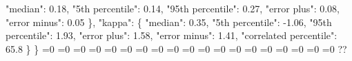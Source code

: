 {{        "median": 0.18, %
        "5th percentile": 0.14, %
        "95th percentile": 0.27, %
        "error plus": 0.08, %
        "error minus": 0.05%
      \}, %
      "kappa": \{%
        "median": 0.35, %
        "5th percentile": {-}1.06, %
        "95th percentile": 1.93, %
        "error plus": 1.58, %
        "error minus": 1.41, %
        "correlated percentile": 65.8%
      \}%
    \}}%
  \else%
    \ifnum{}=0%
      \let\mchieffCopulaCorrelationModel@I@out\mchieffCopulaCorrelationModel@III%
    \else%
      \ifnum{}=0%
      \let\mchieffCopulaCorrelationModel@I@out\mchieffCopulaCorrelationModel@IV%
    \else%
      \ifnum{}=0%
      \let\mchieffCopulaCorrelationModel@I@out\mchieffCopulaCorrelationModel@V%
    \else%
      \ifnum{}=0%
      \let\mchieffCopulaCorrelationModel@I@out\mchieffCopulaCorrelationModel@VI%
    \else%
      \ifnum{}=0%
      \let\mchieffCopulaCorrelationModel@I@out\mchieffCopulaCorrelationModel@VII%
    \else%
      \ifnum{}=0%
      \let\mchieffCopulaCorrelationModel@I@out\mchieffCopulaCorrelationModel@VIII%
    \else%
      \ifnum{}=0%
      \let\mchieffCopulaCorrelationModel@I@out\mchieffCopulaCorrelationModel@IX%
    \else%
      \ifnum{}=0%
      \let\mchieffCopulaCorrelationModel@I@out\mchieffCopulaCorrelationModel@X%
    \else%
      \ifnum{}=0%
      \let\mchieffCopulaCorrelationModel@I@out\mchieffCopulaCorrelationModel@XI%
    \else%
      \ifnum{}=0%
      \let\mchieffCopulaCorrelationModel@I@out\mchieffCopulaCorrelationModel@XII%
    \else%
      \ifnum{}=0%
      \let\mchieffCopulaCorrelationModel@I@out\mchieffCopulaCorrelationModel@XIII%
    \else%
      \ifnum{}=0%
      \let\mchieffCopulaCorrelationModel@I@out\mchieffCopulaCorrelationModel@XIV%
    \else%
      \ifnum{}=0%
      \let\mchieffCopulaCorrelationModel@I@out\mchieffCopulaCorrelationModel@XV%
    \else%
      \ifnum{}=0%
      \let\mchieffCopulaCorrelationModel@I@out\mchieffCopulaCorrelationModel@XVI%
    \else%
      \ifnum{}=0%
      \let\mchieffCopulaCorrelationModel@I@out\mchieffCopulaCorrelationModel@XVII%
    \else%
      \ifnum{}=0%
      \let\mchieffCopulaCorrelationModel@I@out\mchieffCopulaCorrelationModel@XVIII%
    \else%
      \ifnum{}=0%
      \let\mchieffCopulaCorrelationModel@I@out\mchieffCopulaCorrelationModel@XIX%
    \else%
      \ifnum{}=0%
      \let\mchieffCopulaCorrelationModel@I@out\mchieffCopulaCorrelationModel@XX%
    \else%
      \ifnum{}=0%
      \let\mchieffCopulaCorrelationModel@I@out\mchieffCopulaCorrelationModel@XXI%
    \else%
      \def\mchieffCopulaCorrelationModel@I@out{%
    ??}%
    \fi\fi\fi\fi\fi\fi\fi\fi\fi\fi\fi\fi\fi\fi\fi\fi\fi\fi\fi
  \fi
  \mchieffCopulaCorrelationModel@I@out
}\newcommand\mchieffCopulaCorrelationModel@II[1][all]{%
  \ifnum\pdfstrcmp{#1}{all}=0%
    \def\mchieffCopulaCorrelationModel@II@out{%
    \{\}}%
  \else%
    \def\mchieffCopulaCorrelationModel@II@out{%
    ??}%
    
}
